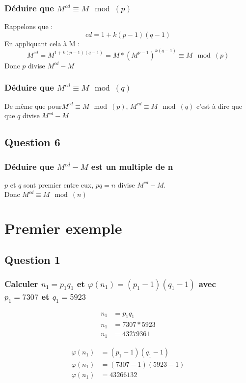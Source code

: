 \documentclass[a4paper,10pt]{article}
\begin{document}
\subsubsection{Déduire que $M^{cd}\equiv M \mod(p)$}
Rappelons que :
\begin{equation}
	cd = 1+k(p-1)(q-1)
\end{equation}
En appliquant cela à M :\\
\begin{equation}
 M^{cd}=M^{1+k(p-1)(q-1)}=M*(M^{p-1})^{k(q-1)}\equiv M \mod(p)
\end{equation}
Donc $p$ divise $M^{cd}-M$
\subsubsection{Déduire que $M^{cd}\equiv M \mod(q)$}
De même que pour$M^{cd}\equiv M \mod(p)$, $M^{cd}\equiv M \mod(q)$ c'est à dire que que $q$ divise $M^{cd}-M$ 
\subsection{Question 6}
\subsubsection{Déduire que $M^{cd} - M$ est un multiple de n}
$p$ et $q$ sont premier entre eux, $pq=n$ divise $M^{cd} - M$.\\
Donc $M^{cd}\equiv M \mod(n)$
\clearpage
\section{Premier exemple}
\subsection{Question 1}
\subsubsection{Calculer $n_1 = p_1 q_1$ et $\varphi(n_1) = (p_1 - 1)(q_1 - 1)$ avec $p_1 = 7307$ et $q_1 = 5923$}

\begin{align*}
n_1 &= p_1 q_1\\
n_1 &= 7307 * 5923\\
n_1 &= 43279361
\end{align*}

\begin{align*}
\varphi(n_1) &= (p_1 - 1)(q_1 - 1)\\
\varphi(n_1) &= (7307 - 1)(5923 - 1)\\
\varphi(n_1) &= 43266132
\end{align*}
\end{document}
